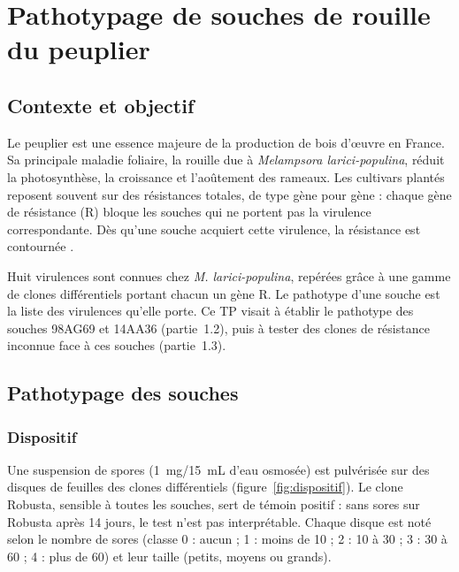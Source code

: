 \documentclass[11pt,a4paper]{article}
\begin{document}
\pagedegarde


\section{Pathotypage de souches de rouille du peuplier}
\subsection{Contexte et objectif}
Le peuplier est une essence majeure de la production de bois d'œuvre en France. Sa principale maladie foliaire, la rouille due à \emph{Melampsora larici-populina}, réduit la photosynthèse, la croissance et l'aoûtement des rameaux. Les cultivars plantés reposent souvent sur des résistances totales, de type gène pour gène : chaque gène de résistance (R) bloque les souches qui ne portent pas la virulence correspondante. Dès qu'une souche acquiert cette virulence, la résistance est contournée \parencite{pinon2005}.

Huit virulences sont connues chez \emph{M. larici-populina}, repérées grâce à une gamme de clones différentiels portant chacun un gène R. Le pathotype d'une souche est la liste des virulences qu'elle porte. Ce TP visait à établir le pathotype des souches 98AG69 et 14AA36 (partie~1.2), puis à tester des clones de résistance inconnue face à ces souches (partie~1.3).

\subsection{Pathotypage des souches}
\subsubsection{Dispositif}
Une suspension de spores (1~mg/15~mL d'eau osmosée) est pulvérisée sur des disques de feuilles des clones différentiels (figure~\ref{fig:dispositif}). Le clone Robusta, sensible à toutes les souches, sert de témoin positif : sans sores sur Robusta après 14 jours, le test n'est pas interprétable. Chaque disque est noté selon le nombre de sores (classe 0 : aucun ; 1 : moins de 10 ; 2 : 10 à 30 ; 3 : 30 à 60 ; 4 : plus de 60) et leur taille (petits, moyens ou grands).
\end{document}
